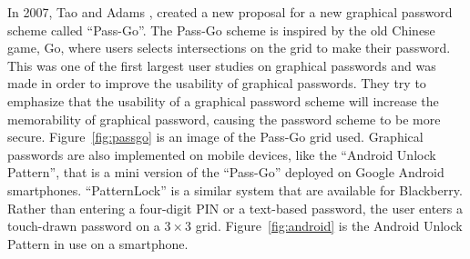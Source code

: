   \begin{figure}[H]
    \centering
  \end{figure}
  
  In 2007, Tao and Adams \cite{Tao}, created a new proposal for a new graphical password scheme called ``Pass-Go''. The Pass-Go scheme is inspired by the old Chinese game, Go, where users selects intersections on the grid to make their password. This was one of the first largest user studies on graphical passwords and was made in order to improve the usability of graphical passwords. They try to emphasize that the usability of a graphical password scheme will increase the memorability of graphical password, causing the password scheme to be more secure. Figure~\ref{fig:passgo} is an image of the Pass-Go grid used. Graphical passwords are also implemented on mobile devices, like the ``Android Unlock Pattern'', that is a mini version of the ``Pass-Go'' deployed on Google Android smartphones. ``PatternLock'' is a similar system that are available for Blackberry. Rather than entering a four-digit PIN or a text-based password, the user enters a touch-drawn password on a $3\times3$ grid. Figure~\ref{fig:android} is the Android Unlock Pattern in use on a smartphone.

